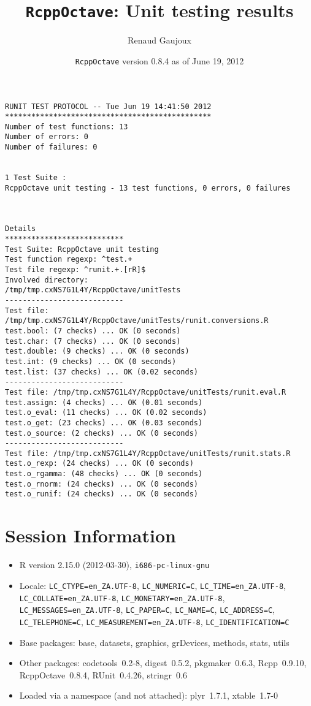 \documentclass[10pt]{article}
\author{Renaud Gaujoux}
\title{\texttt{RcppOctave}: Unit testing results}
\date{\texttt{RcppOctave} version 0.8.4 as of June 19, 2012}
\begin{document}
\maketitle

\begin{verbatim}
RUNIT TEST PROTOCOL -- Tue Jun 19 14:41:50 2012 
*********************************************** 
Number of test functions: 13 
Number of errors: 0 
Number of failures: 0 

 
1 Test Suite : 
RcppOctave unit testing - 13 test functions, 0 errors, 0 failures



Details 
*************************** 
Test Suite: RcppOctave unit testing 
Test function regexp: ^test.+ 
Test file regexp: ^runit.+.[rR]$ 
Involved directory: 
/tmp/tmp.cxNS7G1L4Y/RcppOctave/unitTests 
--------------------------- 
Test file: /tmp/tmp.cxNS7G1L4Y/RcppOctave/unitTests/runit.conversions.R 
test.bool: (7 checks) ... OK (0 seconds)
test.char: (7 checks) ... OK (0 seconds)
test.double: (9 checks) ... OK (0 seconds)
test.int: (9 checks) ... OK (0 seconds)
test.list: (37 checks) ... OK (0.02 seconds)
--------------------------- 
Test file: /tmp/tmp.cxNS7G1L4Y/RcppOctave/unitTests/runit.eval.R 
test.assign: (4 checks) ... OK (0.01 seconds)
test.o_eval: (11 checks) ... OK (0.02 seconds)
test.o_get: (23 checks) ... OK (0.03 seconds)
test.o_source: (2 checks) ... OK (0 seconds)
--------------------------- 
Test file: /tmp/tmp.cxNS7G1L4Y/RcppOctave/unitTests/runit.stats.R 
test.o_rexp: (24 checks) ... OK (0 seconds)
test.o_rgamma: (48 checks) ... OK (0 seconds)
test.o_rnorm: (24 checks) ... OK (0 seconds)
test.o_runif: (24 checks) ... OK (0 seconds)
\end{verbatim}

\section*{Session Information}
\begin{itemize}\raggedright
  \item R version 2.15.0 (2012-03-30), \verb|i686-pc-linux-gnu|
  \item Locale: \verb|LC_CTYPE=en_ZA.UTF-8|, \verb|LC_NUMERIC=C|, \verb|LC_TIME=en_ZA.UTF-8|, \verb|LC_COLLATE=en_ZA.UTF-8|, \verb|LC_MONETARY=en_ZA.UTF-8|, \verb|LC_MESSAGES=en_ZA.UTF-8|, \verb|LC_PAPER=C|, \verb|LC_NAME=C|, \verb|LC_ADDRESS=C|, \verb|LC_TELEPHONE=C|, \verb|LC_MEASUREMENT=en_ZA.UTF-8|, \verb|LC_IDENTIFICATION=C|
  \item Base packages: base, datasets, graphics, grDevices, methods,
    stats, utils
  \item Other packages: codetools~0.2-8, digest~0.5.2, pkgmaker~0.6.3,
    Rcpp~0.9.10, RcppOctave~0.8.4, RUnit~0.4.26, stringr~0.6
  \item Loaded via a namespace (and not attached): plyr~1.7.1,
    xtable~1.7-0
\end{itemize}
\end{document}
